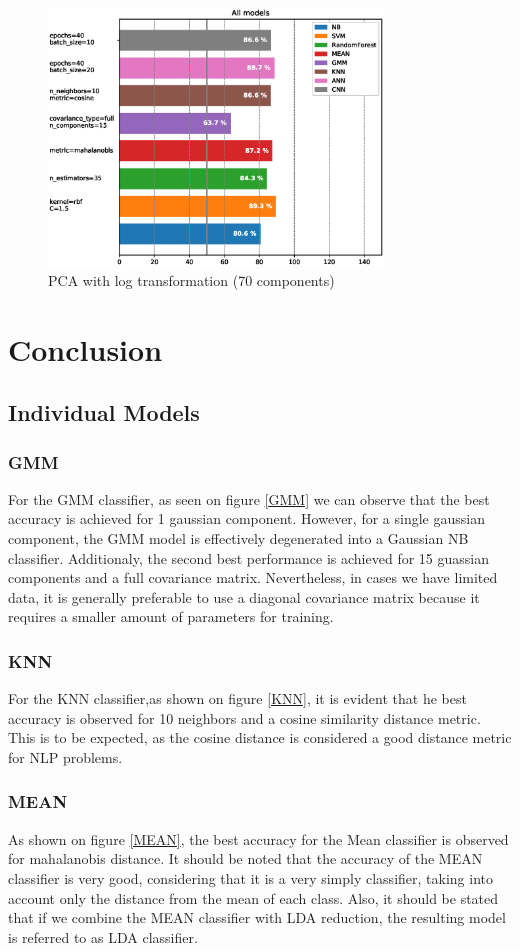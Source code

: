 \documentclass[10pt,journal,compsoc]{IEEEtran}
\begin{document}
\begin{figure}[!h]
	\centering
	\includegraphics[width=3.5in]{./img/all_models_pca_70_log.eps}
	\caption{PCA with log transformation (70 components)}
	\label{PCAlog}
\end{figure}

\section{Conclusion}
\subsection{Individual Models}
\subsubsection{GMM}
For the GMM classifier, as seen on figure 
\ref{GMM} we can observe that the 
best accuracy  is achieved for 1 
gaussian component.
However, for a single gaussian component,
the GMM model is effectively degenerated
into a Gaussian NB classifier.
Additionaly, the second best performance
is achieved for 15 guassian components
and a full covariance matrix.
Nevertheless, in cases we have limited data, 
it is generally preferable to use a
diagonal covariance matrix because it requires 
a smaller amount of parameters
for training.

\subsubsection{KNN}
For the KNN classifier,as shown on figure \ref{KNN}, 
it is evident that he best accuracy is observed 
for 10 neighbors and a cosine similarity 
distance metric.
This is to be expected, as the cosine distance
is considered a good distance metric for NLP
problems.

\subsubsection{MEAN}
As shown on figure \ref{MEAN}, the best
accuracy for the Mean classifier is observed
for mahalanobis distance.
It should be noted that the accuracy of the
MEAN classifier is very good, considering that
it is a very simply classifier, taking into
account only the distance from the mean of
each class.
Also, it should be stated that if we combine
the MEAN classifier with LDA reduction, the
resulting model is referred to as LDA classifier.
\end{document}
